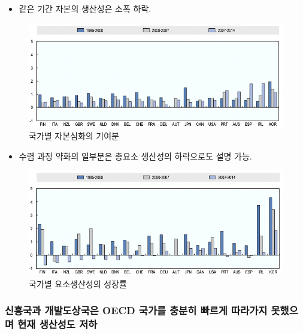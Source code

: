 \documentclass[aspectratio=169,xcolor=dvipsnames,handout]{beamer}
\begin{document}
\begin{frame}{}
    \begin{itemize}
        \item 같은 기간 자본의 생산성은 소폭 하락.
    \end{itemize}
    \begin{figure}
        \centering
        \includegraphics[scale=.4]{pic/tpin1.2.2.png}
        \caption{국가별 자본심화의 기여분}
    \end{figure}
\end{frame}

\begin{frame}{}
    \begin{itemize}
        \item 수렴 과정 약화의 일부분은 총요소 생산성의 하락으로도 설명 가능.
    \end{itemize}
    \begin{figure}
        \centering
        \includegraphics[scale=.4]{pic/tpin1.2.3.png}
        \caption{국가별 요소생산성의 성장률}
    \end{figure}
\end{frame}

\subsubsection{ 신흥국과 개발도상국은 OECD 국가를 충분히 빠르게 따라가지 못했으며 현재 생산성도 저하}
\end{document}
